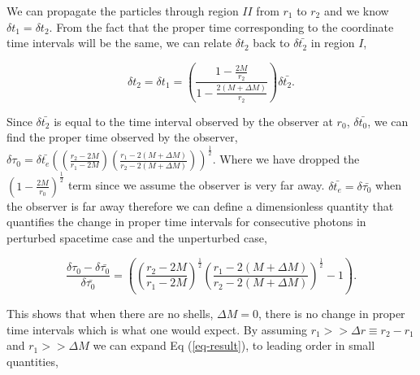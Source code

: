 \documentclass[aps,showpacs,onecolumn,floats,prd,superscriptaddress,nofootinbib]{revtex4-1}
\begin{document}
We can propagate the particles through region $II$ from $r_1$ to $r_2$ and we know $\delta t_1 = \delta t_2$. From the fact that the proper time corresponding to the coordinate time intervals will be the same, we can relate $\delta t_2$ back to $\delta \bar{t_2}$ in region $I$, 

\begin{equation}
	\delta t_2 = \delta t_1= \left( \frac{1 - \frac{2M}{r_2}}{1 - \frac{2(M + \Delta M)}{r_2}} \right) \delta \bar{t_2}.	\label{7}
\end{equation}

Since $\delta \bar{t_2}$ is equal to the time interval observed by the observer at $r_0$, $\delta \bar{t_0}$, we can find the proper time observed by the observer, $\delta {\tau_0}  = \delta {\bar{t_e}} \left( \left( \frac{r_2 - 2M}{r_1 - 2M} \right) \left( \frac{r_1 - 2(M+\Delta M)}{r_2 - 2(M + \Delta M)} \right) \right)^\frac{1}{2}$. Where we have dropped the $\left( 1 - \frac{2M}{r_0} \right)^\frac{1}{2}$ term since we assume the observer is very far away. $\delta {\bar{t_e}} = \delta {\bar{\tau_0}}$ when the observer is far away therefore we can define a dimensionless quantity that quantifies the change in proper time intervals for consecutive photons in perturbed spacetime case and the unperturbed case, 

\begin{equation}
	 \frac{\delta \tau_0 - \delta \bar{\tau_0}}{\delta \bar{\tau_0}} = \left( \left( \frac{r_2 - 2M}{r_1 - 2M} \right)^\frac{1}{2} \left( \frac{r_1 - 2(M+\Delta M)}{r_2 - 2(M+\Delta M)} \right)^\frac{1}{2} - 1\right).	\label{10}
\end{equation}

This shows that when there are no shells, $\Delta M = 0$, there is no change in proper time intervals which is what one would expect. By assuming $r_1>> \Delta r \equiv r_2 - r_1$ and $r_1>> \Delta M$ we can expand Eq (\ref{eq-result}), to leading order in small quantities,
\end{document}
